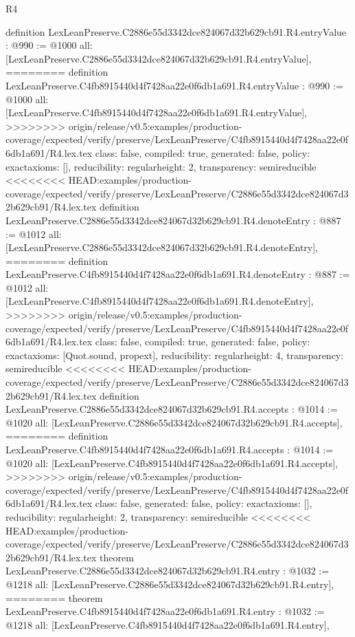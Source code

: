 \begin{lexlean}{R4}
\begin{coremodule}
{{{{{{{{{{{{{{definition LexLeanPreserve.C2886e55d3342dce824067d32b629cb91.R4.entryValue : @990 := @1000 {
  all: [LexLeanPreserve.C2886e55d3342dce824067d32b629cb91.R4.entryValue],
========
definition LexLeanPreserve.C4fb8915440d4f7428aa22e0f6db1a691.R4.entryValue : @990 := @1000 {
  all: [LexLeanPreserve.C4fb8915440d4f7428aa22e0f6db1a691.R4.entryValue],
>>>>>>>> origin/release/v0.5:examples/production-coverage/expected/verify/preserve/LexLeanPreserve/C4fb8915440d4f7428aa22e0f6db1a691/R4.lex.tex
  class: false,
  compiled: true,
  generated: false,
  policy: exact{axioms: []},
  reducibility: regular{height: 2},
  transparency: semireducible
}
<<<<<<<< HEAD:examples/production-coverage/expected/verify/preserve/LexLeanPreserve/C2886e55d3342dce824067d32b629cb91/R4.lex.tex
definition LexLeanPreserve.C2886e55d3342dce824067d32b629cb91.R4.denoteEntry : @887 := @1012 {
  all: [LexLeanPreserve.C2886e55d3342dce824067d32b629cb91.R4.denoteEntry],
========
definition LexLeanPreserve.C4fb8915440d4f7428aa22e0f6db1a691.R4.denoteEntry : @887 := @1012 {
  all: [LexLeanPreserve.C4fb8915440d4f7428aa22e0f6db1a691.R4.denoteEntry],
>>>>>>>> origin/release/v0.5:examples/production-coverage/expected/verify/preserve/LexLeanPreserve/C4fb8915440d4f7428aa22e0f6db1a691/R4.lex.tex
  class: false,
  compiled: true,
  generated: false,
  policy: exact{axioms: [Quot.sound, propext]},
  reducibility: regular{height: 4},
  transparency: semireducible
}
<<<<<<<< HEAD:examples/production-coverage/expected/verify/preserve/LexLeanPreserve/C2886e55d3342dce824067d32b629cb91/R4.lex.tex
definition LexLeanPreserve.C2886e55d3342dce824067d32b629cb91.R4.accepts : @1014 := @1020 {
  all: [LexLeanPreserve.C2886e55d3342dce824067d32b629cb91.R4.accepts],
========
definition LexLeanPreserve.C4fb8915440d4f7428aa22e0f6db1a691.R4.accepts : @1014 := @1020 {
  all: [LexLeanPreserve.C4fb8915440d4f7428aa22e0f6db1a691.R4.accepts],
>>>>>>>> origin/release/v0.5:examples/production-coverage/expected/verify/preserve/LexLeanPreserve/C4fb8915440d4f7428aa22e0f6db1a691/R4.lex.tex
  class: false,
  generated: false,
  policy: exact{axioms: []},
  reducibility: regular{height: 2},
  transparency: semireducible
}
<<<<<<<< HEAD:examples/production-coverage/expected/verify/preserve/LexLeanPreserve/C2886e55d3342dce824067d32b629cb91/R4.lex.tex
theorem LexLeanPreserve.C2886e55d3342dce824067d32b629cb91.R4.entry : @1032 := @1218 {
  all: [LexLeanPreserve.C2886e55d3342dce824067d32b629cb91.R4.entry],
========
theorem LexLeanPreserve.C4fb8915440d4f7428aa22e0f6db1a691.R4.entry : @1032 := @1218 {
  all: [LexLeanPreserve.C4fb8915440d4f7428aa22e0f6db1a691.R4.entry],
}}}}}}}}}}}}}}}}}}}
\end{coremodule}
\end{lexlean}
